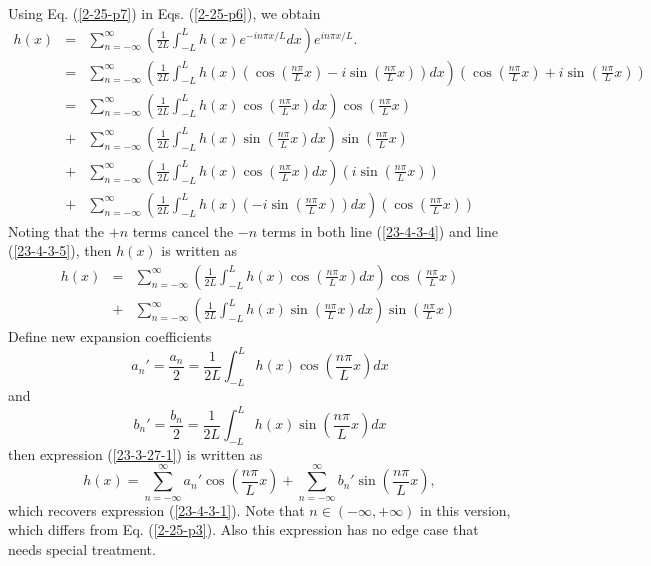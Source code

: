 \documentclass{article}
\begin{document}
Using Eq. (\ref{2-25-p7}) in Eqs. (\ref{2-25-p6}), we obtain
\begin{eqnarray}
  h (x) & = & \sum_{n = - \infty}^{\infty} \left( \frac{1}{2 L} \int_{- L}^L h
  (x) e^{- i n \pi x / L} d x \right) e^{i n \pi x / L} . \nonumber\\
  & = & \sum_{n = - \infty}^{\infty} \left( \frac{1}{2 L} \int_{- L}^L h (x)
  \left( \cos \left( \frac{n \pi}{L} x \right) - i \sin \left( \frac{n \pi}{L}
  x \right) \right) d x \right) \left( \cos \left( \frac{n \pi}{L} x \right) +
  i \sin \left( \frac{n \pi}{L} x \right) \right) \nonumber\\
  & = & \sum_{n = - \infty}^{\infty} \left( \frac{1}{2 L} \int_{- L}^L h (x)
  \cos \left( \frac{n \pi}{L} x \right) d x \right) \cos \left( \frac{n
  \pi}{L} x \right) \nonumber\\
  & + & \sum_{n = - \infty}^{\infty} \left( \frac{1}{2 L} \int_{- L}^L h (x)
  \sin \left( \frac{n \pi}{L} x \right) d x \right) \left. \sin \left( \frac{n
  \pi}{L} x \right. \right) \nonumber\\
  & + & \sum_{n = - \infty}^{\infty} \left( \frac{1}{2 L} \int_{- L}^L h (x)
  \left. \cos \left( \frac{n \pi}{L} x \right. \right) d x \right) \left( i
  \sin \left( \frac{n \pi}{L} x \right) \right)  \label{23-4-3-4}\\
  & + & \sum_{n = - \infty}^{\infty} \left( \frac{1}{2 L} \int_{- L}^L h (x)
  \left( - i \sin \left( \frac{n \pi}{L} x \right) \right) d x \right) \left(
  \cos \left( \frac{n \pi}{L} x \right) \right)  \label{23-4-3-5}
\end{eqnarray}
Noting that the $+ n$ terms cancel the $- n$ terms in both line
(\ref{23-4-3-4}) and line (\ref{23-4-3-5}), then $h (x)$ is written as
\begin{eqnarray}
  h (x) & = & \sum_{n = - \infty}^{\infty} \left( \frac{1}{2 L} \int_{- L}^L h
  (x) \cos \left( \frac{n \pi}{L} x \right) d x \right) \cos \left( \frac{n
  \pi}{L} x \right) \nonumber\\
  & + & \sum_{n = - \infty}^{\infty} \left( \frac{1}{2 L} \int_{- L}^L h (x)
  \sin \left( \frac{n \pi}{L} x \right) d x \right) \left. \sin \left( \frac{n
  \pi}{L} x \right. \right)  \label{23-3-27-1}
\end{eqnarray}
Define new expansion coefficients
\begin{equation}
  a_n' = \frac{a_n}{2} = \frac{1}{2 L} \int_{- L}^L h (x) \cos \left( \frac{n
  \pi}{L} x \right) d x
\end{equation}
and
\begin{equation}
  b_n' = \frac{b_n}{2} = \frac{1}{2 L} \int_{- L}^L h (x) \sin \left( \frac{n
  \pi}{L} x \right) d x
\end{equation}
then expression (\ref{23-3-27-1}) is written as
\begin{equation}
  h (x) = \sum_{n = - \infty}^{\infty} a_n' \cos \left( \frac{n \pi}{L} x
  \right) + \sum_{n = - \infty}^{\infty} b_n' \left. \sin \left( \frac{n
  \pi}{L} x \right. \right),
\end{equation}
which recovers expression (\ref{23-4-3-1}). Note that $n \in (- \infty, +
\infty)$ in this version, which differs from Eq. (\ref{2-25-p3}). Also this
expression has no edge case that needs special treatment.
\end{document}
